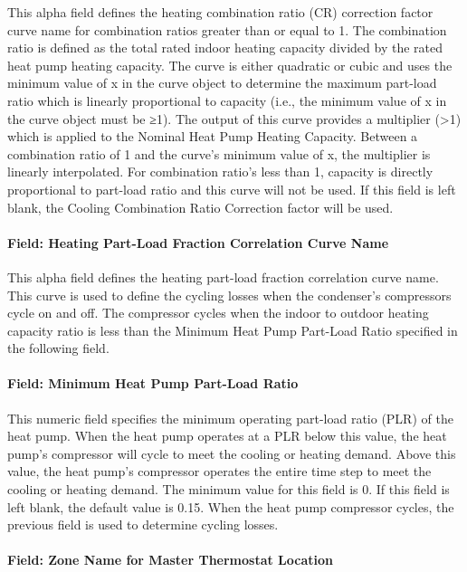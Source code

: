 This alpha field defines the heating combination ratio (CR) correction factor curve name for combination ratios greater than or equal to 1. The combination ratio is defined as the total rated indoor heating capacity divided by the rated heat pump heating capacity. The curve is either quadratic or cubic and uses the minimum value of x in the curve object to determine the maximum part-load ratio which is linearly proportional to capacity (i.e., the minimum value of x in the curve object must be ≥1). The output of this curve provides a multiplier (\textgreater{}1) which is applied to the Nominal Heat Pump Heating Capacity. Between a combination ratio of 1 and the curve's minimum value of x, the multiplier is linearly interpolated. For combination ratio's less than 1, capacity is directly proportional to part-load ratio and this curve will not be used. If this field is left blank, the Cooling Combination Ratio Correction factor will be used.

\paragraph{Field: Heating Part-Load Fraction Correlation Curve Name}\label{field-heating-part-load-fraction-correlation-curve-name}

This alpha field defines the heating part-load fraction correlation curve name. This curve is used to define the cycling losses when the condenser's compressors cycle on and off. The compressor cycles when the indoor to outdoor heating capacity ratio is less than the Minimum Heat Pump Part-Load Ratio specified in the following field.

\paragraph{Field: Minimum Heat Pump Part-Load Ratio}\label{field-minimum-heat-pump-part-load-ratio-000}

This numeric field specifies the minimum operating part-load ratio (PLR) of the heat pump. When the heat pump operates at a PLR below this value, the heat pump's compressor will cycle to meet the cooling or heating demand. Above this value, the heat pump's compressor operates the entire time step to meet the cooling or heating demand. The minimum value for this field is 0. If this field is left blank, the default value is 0.15. When the heat pump compressor cycles, the previous field is used to determine cycling losses.

\paragraph{Field: Zone Name for Master Thermostat Location}\label{field-zone-name-for-master-thermostat-location-000}


